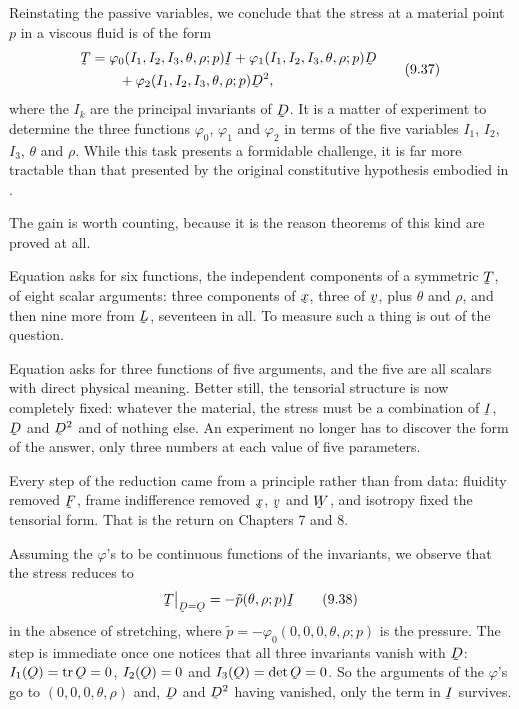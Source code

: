 Reinstating the passive variables, we conclude that the stress at a
material point $p$ in a viscous fluid is of the form
\begin{equation}
\begin{aligned}
   \bT&=\varphi_{0}(I_{1},I_{2},I_{3},\theta,\rho;p)\I
       +\varphi_{1}(I_{1},I_{2},I_{3},\theta,\rho;p)\bD\\
      &\qquad+\varphi_{2}(I_{1},I_{2},I_{3},\theta,\rho;p)\bD^{2},
\end{aligned}
   \tag{9.37}\label{eq:9.37}
\end{equation}
where the $I_{k}$ are the principal invariants of $\bD$. It is a matter
of experiment to determine the three functions $\varphi_{0}$,
$\varphi_{1}$ and $\varphi_{2}$ in terms of the five variables $I_{1}$,
$I_{2}$, $I_{3}$, $\theta$ and $\rho$. While this task presents a
formidable challenge, it is far more tractable than that presented by
the original constitutive hypothesis embodied in .

\begin{remark}\label{rem:ch9count}
The gain is worth counting, because it is the reason theorems of this
kind are proved at all.

Equation  asks for six functions, the independent components of
a symmetric $\bT$, of eight scalar arguments: three components of $\bx$,
three of $\bv$, plus $\theta$ and $\rho$, and then nine more from $\bL$,
seventeen in all. To measure such a thing is out of the question.

Equation  asks for three functions of five arguments, and the
five are all scalars with direct physical meaning. Better still, the
tensorial structure is now completely fixed: whatever the material, the
stress must be a combination of $\I$, $\bD$ and $\bD^{2}$ and of nothing
else. An experiment no longer has to discover the form of the answer,
only three numbers at each value of five parameters.

Every step of the reduction came from a principle rather than from
data: fluidity removed $\bF$, frame indifference removed $\bx$, $\bv$
and $\bW$, and isotropy fixed the tensorial form. That is the return on
Chapters 7 and 8.
\end{remark}

Assuming the $\varphi$'s to be continuous functions of the invariants,
we observe that the stress reduces to
\begin{equation}
   \bT\rest{\bD=\Ob}=-\tilde p(\theta,\rho;p)\I
   \tag{9.38}\label{eq:9.38}
\end{equation}
in the absence of stretching, where
$\tilde p=-\varphi_{0}(0,0,0,\theta,\rho;p)$ is the pressure. The
step is immediate once one notices that all three invariants vanish with
$\bD$: $I_{1}(\Ob)=\tr\Ob=0$, $I_{2}(\Ob)=0$ and $I_{3}(\Ob)=\det\Ob=0$.
So the arguments of the $\varphi$'s go to $(0,0,0,\theta,\rho)$ and,
$\bD$ and $\bD^{2}$ having vanished, only the term in $\I$ survives.

